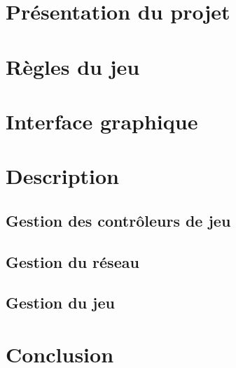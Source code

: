 \section*{Présentation du projet}


\newpage

\section{Règles du jeu}


\newpage

\section{Interface graphique}

	

\newpage

\section{Description}

	\subsection{Gestion des contrôleurs de jeu}
	
	\subsection{Gestion du réseau}
	
	\subsection{Gestion du jeu}
	

\newpage

\section*{Conclusion}

